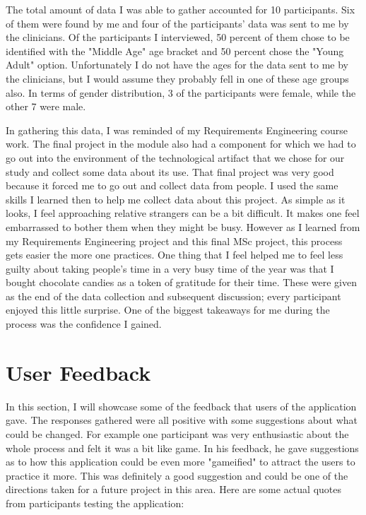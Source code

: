 The total amount of data I was able to gather accounted for 10 participants. Six of them were found by me and four of the participants' data was sent to me by the clinicians. Of the participants I interviewed, 50 percent of them chose to be identified with the "Middle Age" age bracket and 50 percent chose the "Young Adult" option. Unfortunately I do not have the ages for the data sent to me by the clinicians, but I would assume they probably fell in one of these age groups also. In terms of gender distribution, 3 of the participants were female, while the other 7 were male. 

In gathering this data, I was reminded of my Requirements Engineering course work. The final project in the module also had a component for which we had to go out into the environment of the technological artifact that we chose for our study and collect some data about its use. That final project was very good because it forced me to go out and collect data from people. I used the same skills I learned then to help me collect data about this project. As simple as it looks, I feel approaching relative strangers can be a bit difficult. It makes one feel embarrassed to bother them when they might be busy. However as I learned from my Requirements Engineering project and this final MSc project, this process gets easier the more one practices. One thing that I feel helped me to feel less guilty about taking people's time in a very busy time of the year was that I bought chocolate candies as a token of gratitude for their time. These were given as the end of the data collection and subsequent discussion; every participant enjoyed this little surprise. One of the biggest takeaways for me during the process was the confidence I gained. 

\section{User Feedback}
In this section, I will showcase some of the feedback that users of the application gave. The responses gathered were all positive with some suggestions about what could be changed. For example one participant was very enthusiastic about the whole process and felt it was a bit like game. In his feedback, he gave suggestions as to how this application could be even more "gameified" to attract the users to practice it more. This was definitely a good suggestion and could be one of the directions taken for a future project in this area. Here are some actual quotes from participants testing the application:

